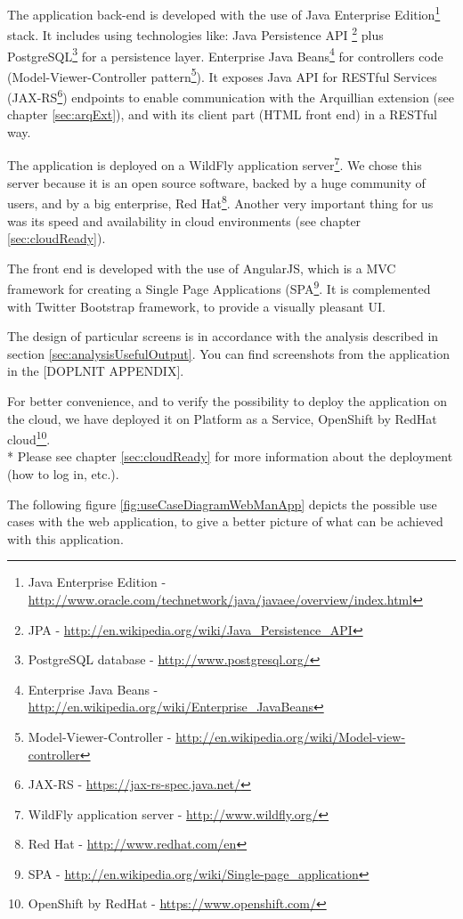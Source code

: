 \documentclass[11pt,oneside,final]{fithesis2}
\begin{document}
    The application back-end is developed with the use of Java Enterprise Edition\footnote{Java Enterprise Edition - 
    \url{http://www.oracle.com/technetwork/java/javaee/overview/index.html}} stack.
    It includes using technologies like: Java Persistence API 
    \footnote{JPA - \url{http://en.wikipedia.org/wiki/Java_Persistence_API}} plus 
    PostgreSQL\footnote{PostgreSQL database - \url{http://www.postgresql.org/}} for a persistence
    layer. Enterprise Java Beans\footnote{Enterprise Java Beans - \url{http://en.wikipedia.org/wiki/Enterprise_JavaBeans}} 
    for controllers code (Model-Viewer-Controller 
    pattern\footnote{Model-Viewer-Controller - \url{http://en.wikipedia.org/wiki/Model-view-controller}}).
    It exposes Java API for RESTful Services (JAX-RS\footnote{JAX-RS - \url{https://jax-rs-spec.java.net/}}) endpoints to
    enable communication with the Arquillian extension (see chapter \ref{sec:arqExt}), and with its client part (HTML front end) in a
    RESTful way.
    
    The application is deployed on a WildFly application server\footnote{WildFly application server - \url{http://www.wildfly.org/}}.
    We chose this server because it is an open source software, backed by a huge community of users, and by a big enterprise,
    Red Hat\footnote{Red Hat - \url{http://www.redhat.com/en}}. Another very important thing for us was its speed and availability in
    cloud environments (see chapter \ref{sec:cloudReady}).
    
    The front end is developed with the use of AngularJS, which is a MVC framework for creating a Single Page Applications 
    (SPA\footnote{SPA - \url{http://en.wikipedia.org/wiki/Single-page_application}}. It is complemented with Twitter Bootstrap
    framework, to provide a visually pleasant UI.
    
    The design of particular screens is in accordance with the analysis described in section \ref{sec:analysisUsefulOutput}.
    You can find screenshots from the application in the [DOPLNIT APPENDIX].
    
    For better convenience, and to verify the possibility to deploy the application on the cloud, we have
    deployed it on Platform as a Service, OpenShift by RedHat cloud\footnote{OpenShift by RedHat - \url{https://www.openshift.com/}}.
    \\* Please see chapter \ref{sec:cloudReady} for more information about the deployment (how to log in, etc.).
    
    The following figure \ref{fig:useCaseDiagramWebManApp} depicts the possible use cases with the web application, to give a better picture of what can be achieved
    with this application.
    
\end{document}
